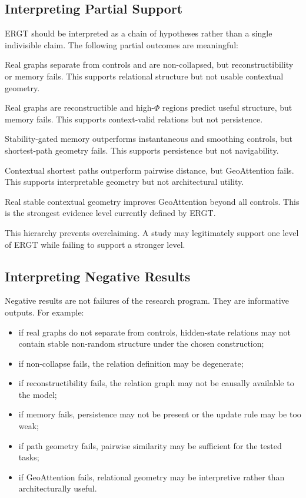 \documentclass[11pt]{article}
\begin{document}
\subsection{Interpreting Partial Support}

ERGT should be interpreted as a chain of hypotheses rather than a single indivisible claim. The following partial outcomes are meaningful:
\begin{description}[leftmargin=2.8em, style=nextline]
    \item[Relational-only support.] Real graphs separate from controls and are non-collapsed, but reconstructibility or memory fails. This supports relational structure but not usable contextual geometry.
    \item[Contextual support.] Real graphs are reconstructible and high-$\Phi$ regions predict useful structure, but memory fails. This supports context-valid relations but not persistence.
    \item[Memory support.] Stability-gated memory outperforms instantaneous and smoothing controls, but shortest-path geometry fails. This supports persistence but not navigability.
    \item[Geometric support.] Contextual shortest paths outperform pairwise distance, but GeoAttention fails. This supports interpretable geometry but not architectural utility.
    \item[Interventional support.] Real stable contextual geometry improves GeoAttention beyond all controls. This is the strongest evidence level currently defined by ERGT.
\end{description}

This hierarchy prevents overclaiming. A study may legitimately support one level of ERGT while failing to support a stronger level.

\subsection{Interpreting Negative Results}

Negative results are not failures of the research program. They are informative outputs. For example:
\begin{itemize}[leftmargin=2em]
    \item if real graphs do not separate from controls, hidden-state relations may not contain stable non-random structure under the chosen construction;
    \item if non-collapse fails, the relation definition may be degenerate;
    \item if reconstructibility fails, the relation graph may not be causally available to the model;
    \item if memory fails, persistence may not be present or the update rule may be too weak;
    \item if path geometry fails, pairwise similarity may be sufficient for the tested tasks;
    \item if GeoAttention fails, relational geometry may be interpretive rather than architecturally useful.
\end{itemize}
\end{document}
